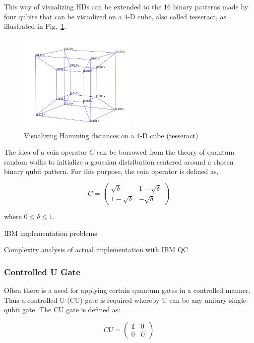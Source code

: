 This way of visualizing HDs can be extended to the 16 binary patterns made by four qubits that can be visualized on a 4-D cube, also called tesseract, as illustrated in Fig.~\ref{img:hypercubenoprobs}.

\begin{figure}[!ht]
       \centering
       \includegraphics[width=0.5\textwidth]{img/hypercubewithoutprobs.png}
       \caption{\label{img:hypercubenoprobs} Visualizing Hamming distances on a 4-D cube (tesseract)}
\end{figure}

The idea of a coin operator $C$ can be borrowed from the theory of quantum random walks to initialize a gaussian distribution centered around a chosen binary qubit pattern. For this purpose, the coin operator is defined as,

\begin{equation}
C = \begin{pmatrix}
\sqrt{\delta} & 1-\sqrt{\delta} \\
1-\sqrt{\delta} & -\sqrt{\delta}
\end{pmatrix}
\end{equation}

where $0 \leq \delta \leq 1$.

IBM implementation problems

Complexity analysis of actual implementation with IBM QC

\subsubsection{Controlled U Gate}
\label{subsubsubsec:controlledugate}

Often there is a need for applying certain quantum gates in a controlled manner. Thus a controlled U (CU) gate is required whereby U can be any unitary single-qubit gate. The CU gate is defined as:

\begin{equation}
CU = \begin{pmatrix}
 \mathbb{1} & 0 \\ 
 0 & U
 \end{pmatrix}
\end{equation}

